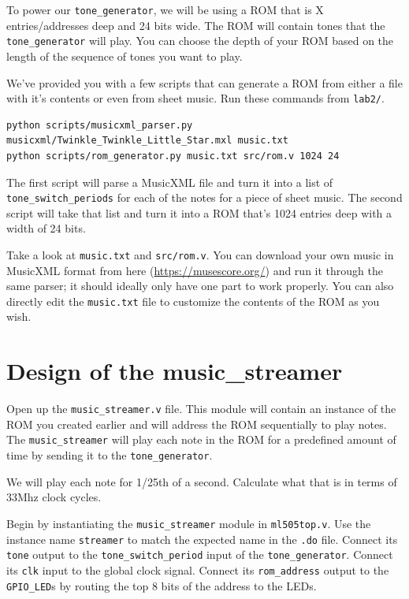 \documentclass[11pt]{article}
\begin{document}
To power our \verb|tone_generator|, we will be using a ROM that is X entries/addresses deep and 24 bits wide. The ROM will contain tones that the \verb|tone_generator| will play. You can choose the depth of your ROM based on the length of the sequence of tones you want to play.

We've provided you with a few scripts that can generate a ROM from either a file with it's contents or even from sheet music. Run these commands from \verb|lab2/|.

\begin{verbatim}
python scripts/musicxml_parser.py musicxml/Twinkle_Twinkle_Little_Star.mxl music.txt
python scripts/rom_generator.py music.txt src/rom.v 1024 24
\end{verbatim}

The first script will parse a MusicXML file and turn it into a list of \verb|tone_switch_periods| for each of the notes for a piece of sheet music. The second script will take that list and turn it into a ROM that's 1024 entries deep with a width of 24 bits.

Take a look at \verb|music.txt| and \verb|src/rom.v|. You can download your own music in MusicXML format from here (\url{https://musescore.org/}) and run it through the same parser; it should ideally only have one part to work properly. You can also directly edit the \verb|music.txt| file to customize the contents of the ROM as you wish.

\section{Design of the music\_streamer}
Open up the \verb|music_streamer.v| file. This module will contain an instance of the ROM you created earlier and will address the ROM sequentially to play notes. The \verb|music_streamer| will play each note in the ROM for a predefined amount of time by sending it to the \verb|tone_generator|. 

We will play each note for 1/25th of a second. Calculate what that is in terms of 33Mhz clock cycles.

Begin by instantiating the \verb|music_streamer| module in \verb|ml505top.v|. Use the instance name \verb|streamer| to match the expected name in the \verb|.do| file. Connect its \verb|tone| output to the \verb|tone_switch_period| input of the \verb|tone_generator|. Connect its \verb|clk| input to the global clock signal. Connect its \verb|rom_address| output to the \verb|GPIO_LED|s by routing the top 8 bits of the address to the LEDs.
\end{document}
